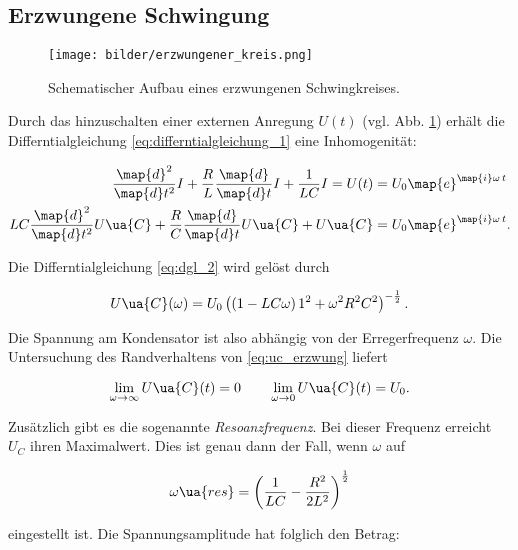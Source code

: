 \subsection{Erzwungene Schwingung}
\begin{figure}
  \centering
  \texttt{[image: bilder/erzwungener\_kreis.png]}
  \caption{Schematischer Aufbau eines erzwungenen Schwingkreises\cite{anleitung354}. }
  \label{fig:erzwungen}
\end{figure}

Durch das hinzuschalten einer externen Anregung $U(t)$ (vgl. Abb. \ref{fig:erzwungen}) %
erhält die Differntialgleichung \eqref{eq:differntialgleichung_1} eine %
Inhomogenität:

\begin{align}
  \frac{\map{d}^2}{\map{d}t^2}I+\frac{R}{L}\frac{\map{d}}{\map{d}t}I+\frac{1}{LC}I=U(t)&=U_0\map{e}^{\map{i}\omega\, t}\notag \\
  LC\frac{\map{d}^2}{\map{d}t^2}U\ua{C}+\frac{R}{C}\frac{\map{d}}{\map{d}t}U\ua{C}+U\ua{C}&=U_0\map{e}^{\map{i}\omega\, t}. \label{eq:dgl_2}
\end{align}

Die Differntialgleichung \eqref{eq:dgl_2} wird gelöst durch

\begin{equation}
  \label{eq:uc_erzwung}
  U\ua{C}(\omega)=U_0\left(\left(1-LC\omega\right)1^2+\omega^2R^2C^2\right)^{-\frac{1}{2}}.
\end{equation}

Die Spannung am Kondensator ist also abhängig von der Erregerfrequenz $\omega$.
Die Untersuchung des Randverhaltens von \eqref{eq:uc_erzwung} liefert

\begin{equation*}
  \lim_{\omega \to \infty} U\ua{C}(t)=0 \qquad \lim_{\omega \to 0} U\ua{C}(t)=U_0.
\end{equation*}

Zusätzlich gibt es die sogenannte \emph{Resoanzfrequenz}.
Bei dieser Frequenz erreicht $U_C$ ihren Maximalwert. Dies ist genau dann der Fall, wenn
$\omega$ auf

\begin{equation*}
  \label{eq:resonanzfrequenz}
  \omega\ua{res}=\left(\frac{1}{LC}-\frac{R^2}{2L^2}\right)^{\frac{1}{2}}
\end{equation*}

eingestellt ist.
Die Spannungsamplitude hat folglich den Betrag:

